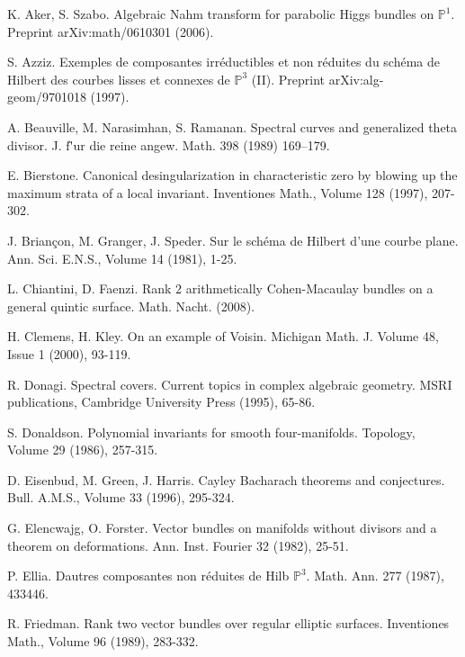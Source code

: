 \documentclass{amsart}
\theoremstyle{plain}
\numberwithin{equation}{section}
\begin{document}

\begin{thebibliography}{A}

K. Aker, S. Szabo. Algebraic Nahm transform for parabolic Higgs bundles on ${{\mathbb P}} ^1$.
Preprint arXiv:math/0610301 (2006).

S. Azziz. Exemples de composantes irr\'eductibles et non r\'eduites du sch\'ema de Hilbert des courbes lisses et connexes de ${{\mathbb P}}^3$ (II). Preprint arXiv:alg-geom/9701018 (1997).

A. Beauville, M. Narasimhan, S. Ramanan. Spectral curves and
generalized theta divisor. J. f\"'ur die reine angew. Math. 398 (1989) 169--179.

E. Bierstone.
Canonical desingularization in characteristic zero by blowing up the maximum strata of a local invariant.
Inventiones Math., Volume 128 (1997), 207-302.

J. Brian\c{c}on, M. Granger, J. Speder. Sur le sch\'ema de Hilbert d'une courbe
plane. Ann. Sci. E.N.S., Volume 14 (1981), 1-25.

L. Chiantini, D. Faenzi. Rank $2$ arithmetically Cohen-Macaulay bundles on a general
quintic surface. Math. Nacht. (2008).

H. Clemens, H. Kley. On an example of Voisin. 
Michigan Math. J. Volume 48, Issue 1 (2000), 93-119. 

R. Donagi. Spectral covers. Current topics in complex algebraic geometry. 
MSRI publications, Cambridge University Press
(1995), 65-86. 

S. Donaldson. Polynomial invariants for smooth four-manifolds. Topology, Volume 29 (1986),
257-315.

D. Eisenbud, M. Green, J. Harris. Cayley Bacharach theorems and conjectures. 
Bull. A.M.S., Volume 33 (1996), 295-324.

G. Elencwajg, O. Forster. Vector bundles on manifolds without divisors and a theorem
on deformations. Ann. Inst. Fourier 32 (1982),  25-51.

P. Ellia. Dautres composantes non r\'eduites de Hilb ${{\mathbb P}} ^3$. Math. Ann. 277 (1987), 433446.

R. Friedman. Rank two vector bundles over regular elliptic surfaces. Inventiones Math., Volume 96 (1989), 283-332. 


\end{thebibliography}
\end{document}

